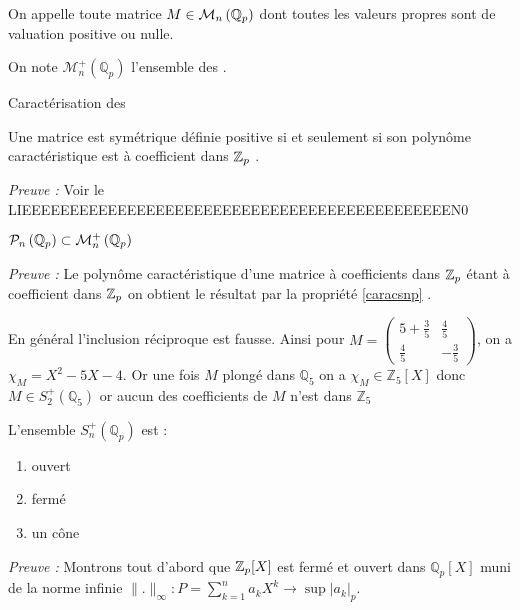 \begin{definition}
	On appelle \mat toute matrice $M \in \mathcal{M}_n\left( \mathbb{Q}_p \right) $ dont toutes les valeurs propres sont de valuation positive ou nulle.

	On note $ \mathcal{M}_n^+\left( \mathbb{Q}_p \right)$ l'ensemble des \mats.
\end{definition}
\begin{propriete}
	\label{caracsnp}
	Caractérisation des \mats

	Une matrice est symétrique définie positive si et seulement si son polynôme caractéristique est à coefficient dans $ \mathbb {Z}_p $ .
	
\end{propriete}
	\textit{Preuve :} Voir le LIEEEEEEEEEEEEEEEEEEEEEEEEEEEEEEEEEEEEEEEEEEEEEN0

\begin{consequence}
	$\mathcal{P}_n \left( \mathbb{Q}_p \right) \subset \mathcal{M}_n^+\left( \mathbb{Q}_p \right)$ 
\end{consequence}

\textit{Preuve : }  Le polynôme caractéristique d'une matrice à coefficients dans $ \mathbb {Z}_p $ étant à coefficient dans $ \mathbb {Z}_p $ on obtient le résultat par la propriété \ref{caracsnp} .

\begin{remarque}
	En général l'inclusion réciproque est fausse. Ainsi pour $M = \begin{pmatrix} 5 + \frac{3}{5} & \frac{4}{5} \\ \frac{4}{5} & -\frac{3}{5} \end{pmatrix} $, on a $\chi_M = X^2  - 5 X - 4$. Or une fois $M$ plongé dans $\mathbb{Q}_5$ on a $\chi_M \in \mathbb{Z}_5[X]$ donc $M \in S_2^+\left( \mathbb{Q}_5 \right)$ or aucun des coefficients de $M$ n'est dans $\mathbb{Z}_5 $
\end{remarque}

\begin{propriete}
	L'ensemble $S_n^+\left( \mathbb{Q}_p \right)$  est :
	\begin{enumerate}[label = \textit{\roman*}.]
		\item ouvert
		\item fermé
		\item un cône
	\end{enumerate}
\end{propriete}

\textit{Preuve :}  
Montrons tout d'abord que $ \mathbb {Z}_p [X]$ est fermé et ouvert dans $\mathbb{Q}_{ p }[X] $ muni de la norme infinie $\|.\|_\infty : P = \sum_{k=1}^{n} a_k X^k \to \sup |a_k|_p$. 

